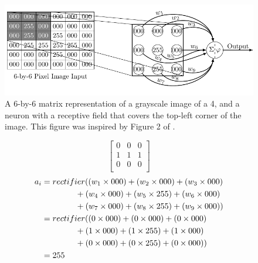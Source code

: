 \documentclass[xcolor={table}]{beamer}
\begin{document}
 \begin{frame} 
\begin{figure}[t]
\centerline{
\includegraphics[width=\textwidth]{./images/fmlpda_8_31.pdf}
}
\caption[A 6-by-6 matrix representation of a grayscale image of a 4, and a neuron with a receptive field that covers the top-left corner of the image.]{A 6-by-6 matrix representation of a grayscale image of a 4, and a neuron with a receptive field that covers the top-left corner of the image. This figure was inspired by Figure 2 of \citep{kelleher2017not}.}
\label{fig:cnn-layer1-receptivefield}
\end{figure}
\end{frame} 



 \begin{frame} 
\begin{equation}
\begin{bmatrix}
0 & 0 & 0\\
1 & 1 & 1\\
0 & 0 & 0\\
\end{bmatrix}
\label{eq:filterexample1}
\end{equation}
\begin{alignat}{2}
a_i&= rectifier(\left(w_1 \times 000\right) + \left(w_2 \times 000\right) + \left(w_3 \times 000\right)\notag\\
~&\hspace{1.45cm}+\left(w_4 \times 000\right) + \left(w_5 \times 255\right) + \left(w_6 \times 000\right)\notag\\
~&\hspace{1.45cm}+\left(w_7 \times 000\right) + \left(w_8 \times 255\right) + \left(w_9 \times 000\right) )\notag\\
~&= rectifier(\left(0 \times 000\right) + \left(0 \times 000\right) + \left(0 \times 000\right)\notag\\
~&\hspace{1.45cm}+\left(1 \times 000\right) + \left(1 \times 255\right) + \left(1 \times 000\right)\notag\\
~&\hspace{1.45cm}+\left(0 \times 000\right) + \left(0 \times 255\right) + \left(0 \times 000\right) )\notag\\
~&= 255~
\label{eq:activationreceptivefield1}
\end{alignat}
\end{frame} 
\end{document}
